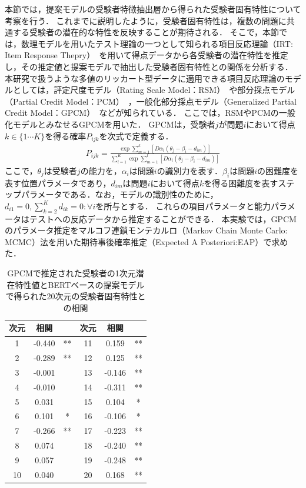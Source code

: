 \documentclass[a4paper,12pt,oneside,openany]{jsbook}
\begin{document}
本節では，提案モデルの受験者特徴抽出層から得られた受験者固有特性について考察を行う．
これまでに説明したように，受験者固有特性は，複数の問題に共通する受験者の潜在的な特性を反映することが期待される．
そこで，本節では，数理モデルを用いたテスト理論の一つとして知られる項目反応理論（IRT: Item Response Thepry）~\cite{IRT1}を用いて得点データから各受験者の潜在特性を推定し，その推定値と提案モデルで抽出した受験者固有特性との関係を分析する．
本研究で扱うような多値のリッカート型データに適用できる項目反応理論のモデルとしては，評定尺度モデル（Rating Scale Model：RSM）~\cite{IRT3}や部分採点モデル（Partial Credit Model：PCM）~\cite{IRT4}，一般化部分採点モデル（Generalized Partial Credit Model：GPCM）~\cite{IRT2}などが知られている．
ここでは，RSMやPCMの一般化モデルとみなせるGPCMを用いた．
GPCMは，受験者$j$が問題$i$において得点$k\in\{1\cdots K\}$を得る確率$P_{ijk}$を次式で定義する．
\begin{eqnarray} 
P_{ijk} = \frac{\exp{\sum_{m=1}^k[D\alpha_i(\theta_j-\beta_{i}-d_{im})]}}{\sum_{l=1}^K\exp{\sum_{m=1}^l[D\alpha_i(\theta_j-\beta_{i}-d_{im})]}}
\end{eqnarray}
ここで，$\theta_j$は受験者$j$の能力を，$\alpha_i$は問題$i$の識別力を表す．$\beta_{i}$は問題$i$の困難度を表す位置パラメータであり，$d_{im}$は問題$i$において得点$k$を得る困難度を表すステップパラメータである．なお，モデルの識別性のために，$d_{i1} = 0,\sum_{k=2}^K d_{ik} = 0:\forall i$を所与とする．
これらの項目パラメータと能力パラメータはテストへの反応データから推定することができる．
本実験では，GPCMのパラメータ推定をマルコフ連鎖モンテカルロ（Markov Chain Monte Carlo: MCMC）法を用いた期待事後確率推定（Expected A Posteriori:EAP）で求めた．

\begin{table}[t]
\center
\caption{GPCMで推定された受験者の1次元潜在特性値とBERTベースの提案モデルで得られた20次元の受験者固有特性との相関} \label{tb:relation}
\begin{tabular}{ccc|ccc}
\hline
次元& 相関& & 次元& 相関&  \\
\hline
1& -0.440& **& 11& 0.159& ** \\
2& -0.289& **& 12& 0.125& ** \\
3& -0.001& & 13& -0.146& ** \\
4& -0.010& & 14& -0.311& ** \\
5& 0.031& & 15& 0.104& * \\
6& 0.101& *& 16& -0.106& * \\
7& -0.266& **& 17& -0.223& ** \\
8& 0.074& & 18& -0.240& ** \\
9& 0.057& & 19& -0.248& ** \\
10& 0.040& & 20& 0.168& ** \\
\hline
\end{tabular}
\end{table}
\end{document}
